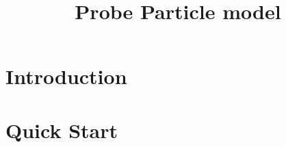 \documentclass[english]{book}
\title{Probe Particle model}
\author{}
\begin{document}
\maketitle

\tableofcontents

\chapter{Introduction}
  

\chapter{Quick Start}

\end{document}
